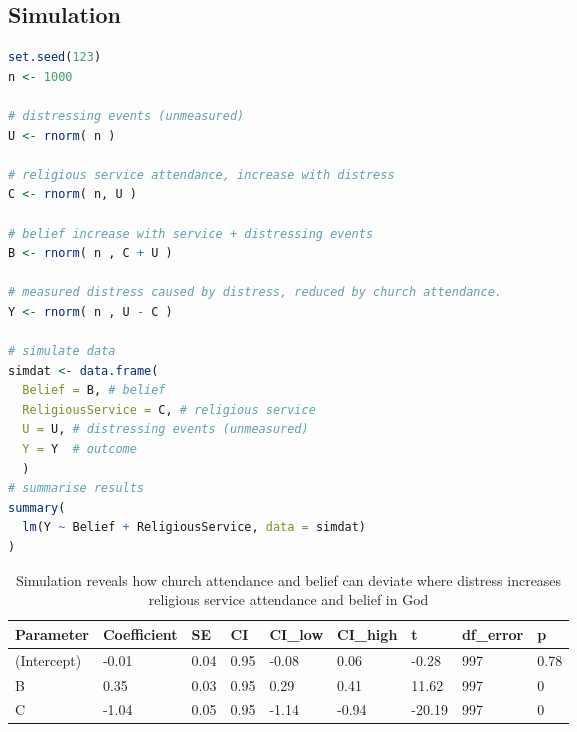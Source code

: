\documentclass[man]{article}%
\begin{document}
\subsection{Simulation}
\singlespace
\begin{lstlisting}[language=R]
set.seed(123)
n <- 1000

# distressing events (unmeasured)
U <- rnorm( n ) 

# religious service attendance, increase with distress
C <- rnorm( n, U ) 

# belief increase with service + distressing events
B <- rnorm( n , C + U )

# measured distress caused by distress, reduced by church attendance.
Y <- rnorm( n , U - C ) 

# simulate data
simdat <- data.frame(
  Belief = B, # belief
  ReligiousService = C, # religious service
  U = U, # distressing events (unmeasured)
  Y = Y  # outcome
  )
# summarise results
summary(
  lm(Y ~ Belief + ReligiousService, data = simdat)
)
\end{lstlisting}

\begin{table}
\caption{Simulation reveals how church attendance and belief can deviate where distress increases religious service attendance and belief in God}
\centering
\begin{tabular}[t]{lllllllll}
\toprule
Parameter & Coefficient & SE & CI & CI\_low & CI\_high & t & df\_error & p\\
\midrule
(Intercept) & -0.01 & 0.04 & 0.95 & -0.08 & 0.06 & -0.28 & 997 & 0.78\\
B & 0.35 & 0.03 & 0.95 & 0.29 & 0.41 & 11.62 & 997 & 0\\
C & -1.04 & 0.05 & 0.95 & -1.14 & -0.94 & -20.19 & 997 & 0\\
\bottomrule
\end{tabular}
\end{table}
\end{document}
